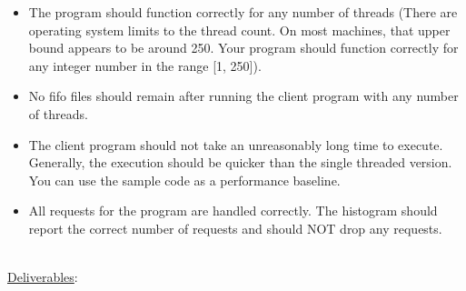 \documentclass[12pt]{extarticle}
\newenvironment{myindentpar}[1]%
 {\begin{list}{}%
         {\setlength{\leftmargin}{#1}}%
         \item[]%
 }
 {\end{list}}
\begin{document}
\begin{myindentpar}{5mm}
\begin{itemize}
	    \item The program should function correctly for any number of threads (There are operating system limits to the thread count.  On most machines, that upper bound appears to be around 250.  Your program should function correctly for any integer number in the range [1, 250]).  
	    \item No fifo files should remain after running the client program with any number of threads.  
	    \item The client program should not take an unreasonably long time to execute.  Generally, the execution should be quicker than the single threaded version.  You can use the sample code as a performance baseline.  
	    \item All requests for the program are handled correctly.  The histogram should report the correct number of requests and should NOT drop any requests.  
	    
	\end{itemize}

\end{myindentpar}

\ \\
{\large \underline{Deliverables}:}
\end{document}
